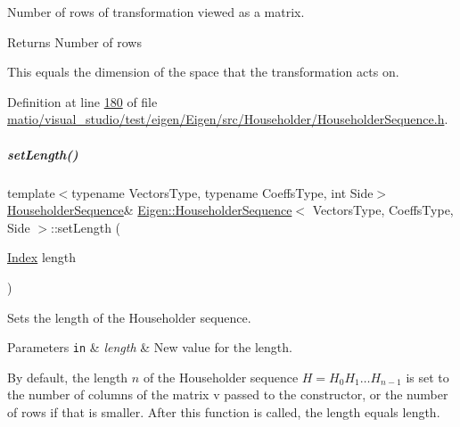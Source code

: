 Number of rows of transformation viewed as a matrix. 

\begin{DoxyReturn}{Returns}
Number of rows
\end{DoxyReturn}
This equals the dimension of the space that the transformation acts on. 

Definition at line \hyperlink{matio_2visual__studio_2test_2eigen_2_eigen_2src_2_householder_2_householder_sequence_8h_source_l00180}{180} of file \hyperlink{matio_2visual__studio_2test_2eigen_2_eigen_2src_2_householder_2_householder_sequence_8h_source}{matio/visual\+\_\+studio/test/eigen/\+Eigen/src/\+Householder/\+Householder\+Sequence.\+h}.

\mbox{\label{group___householder___module_a30cc06d5b2ca4b7dcf5fcd53313d25fc}} 
\subparagraph{\texorpdfstring{set\+Length()}{setLength()}\hspace{0.1cm}{\footnotesize\ttfamily [1/2]}}
{\footnotesize\ttfamily template$<$typename Vectors\+Type, typename Coeffs\+Type, int Side$>$ \\
\hyperlink{group___householder___module_class_eigen_1_1_householder_sequence}{Householder\+Sequence}\& \hyperlink{group___householder___module_class_eigen_1_1_householder_sequence}{Eigen\+::\+Householder\+Sequence}$<$ Vectors\+Type, Coeffs\+Type, Side $>$\+::set\+Length (\begin{DoxyParamCaption}\item[{\hyperlink{group___core___module_a554f30542cc2316add4b1ea0a492ff02}{Index}}]{length }\end{DoxyParamCaption})\hspace{0.3cm}{\ttfamily [inline]}}



Sets the length of the Householder sequence. 


\begin{DoxyParams}[1]{Parameters}
\mbox{\tt in}  & {\em length} & New value for the length.\\
\hline
\end{DoxyParams}
By default, the length $ n $ of the Householder sequence $ H = H_0 H_1 \ldots H_{n-1} $ is set to the number of columns of the matrix {\ttfamily v} passed to the constructor, or the number of rows if that is smaller. After this function is called, the length equals {\ttfamily length}.

